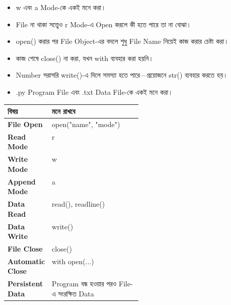 \begin{rememberbox}
\begin{itemize}
\item \textenglish{\ttfamily w} এবং \textenglish{\ttfamily a} Mode-কে একই মনে করা।
\item File না থাকা সত্ত্বেও \textenglish{\ttfamily r} Mode-এ Open করলে কী হতে পারে তা না বোঝা।
\item \textenglish{\ttfamily open()} করার পর File Object-এর বদলে শুধু File Name নিয়েই কাজ করার চেষ্টা করা।
\item কাজ শেষে \textenglish{\ttfamily close()} না করা, যখন \textenglish{\ttfamily with} ব্যবহার করা হয়নি।
\item Number সরাসরি \textenglish{\ttfamily write()}-এ দিলে সমস্যা হতে পারে—প্রয়োজনে \textenglish{\ttfamily str()} ব্যবহার করতে হয়।
\item \textenglish{\ttfamily .py} Program File এবং \textenglish{\ttfamily .txt} Data File-কে একই মনে করা।
\end{itemize}
\end{rememberbox}



\begin{tabularx}{\linewidth}{|>{\bfseries\RaggedRight\arraybackslash}p{0.31\linewidth}|Y|}
\hline
{}
\textbf{বিষয়} & \textbf{মনে রাখবে}\\
\hline
File Open & \textenglish{\ttfamily open("name", "mode")}\\
\hline
Read Mode & \textenglish{\ttfamily r}\\
\hline
Write Mode & \textenglish{\ttfamily w}\\
\hline
Append Mode & \textenglish{\ttfamily a}\\
\hline
Data Read & \textenglish{\ttfamily read()}, \textenglish{\ttfamily readline()}\\
\hline
Data Write & \textenglish{\ttfamily write()}\\
\hline
File Close & \textenglish{\ttfamily close()}\\
\hline
Automatic Close & \textenglish{\ttfamily with open(...)}\\
\hline
Persistent Data & Program বন্ধ হওয়ার পরও File-এ সংরক্ষিত Data\\
\hline
\end{tabularx}

